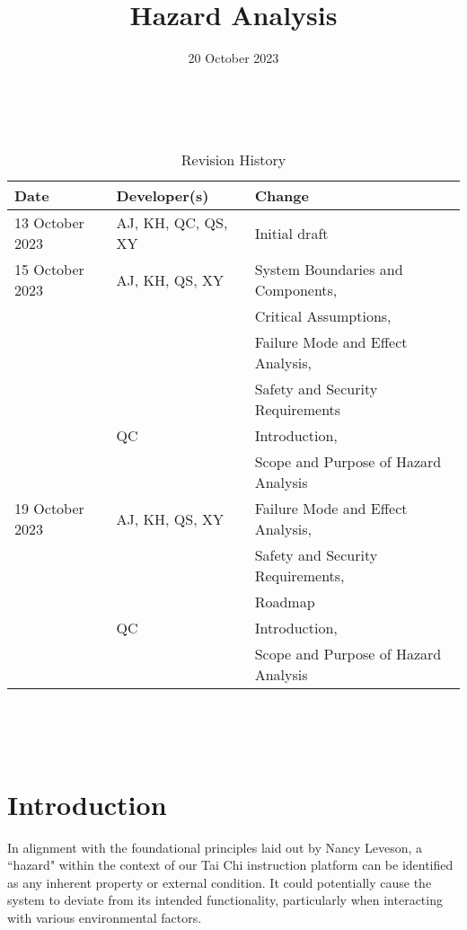 \documentclass{article}
\title{Hazard Analysis\\\progname}
\author{\authname}
\date{20 October 2023}
\begin{document}
\maketitle
\thispagestyle{empty}

~\newpage


\begin{table}[hp]
  \caption{Revision History} \label{TblRevisionHistory}
  \begin{tabularx}{\textwidth}{llX}
    \toprule
    \textbf{Date} & \textbf{Developer(s)} & \textbf{Change}\\
    \midrule
    13 October 2023 & AJ, KH, QC, QS, XY & Initial draft \\
    \midrule
    15 October 2023 & AJ, KH, QS, XY & System Boundaries and Components,\\
    & & Critical Assumptions,\\
    & & Failure Mode and Effect Analysis,\\
    & & Safety and Security Requirements\\
    \midrule
    & QC & Introduction,\\
    & & Scope and Purpose of Hazard Analysis\\
    \midrule
    19 October 2023 & AJ, KH, QS, XY & Failure Mode and Effect Analysis,\\
    & & Safety and Security Requirements,\\
    & & Roadmap\\
    \midrule
    & QC & Introduction,\\
    & & Scope and Purpose of Hazard Analysis\\       
    \bottomrule
  \end{tabularx}
\end{table}

~\newpage

\tableofcontents

~\newpage


\section{Introduction}

In alignment with the foundational principles laid out by Nancy Leveson, a ``hazard"
 within the context of our Tai Chi instruction platform can be
identified as any inherent property or external condition. It could potentially
cause the system to deviate from its intended functionality, particularly when
interacting with various environmental factors.
\end{document}
